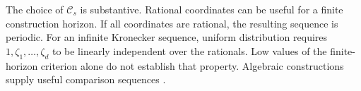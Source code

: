 The choice of $\mathcal C_s$ is substantive. Rational coordinates can be useful for a finite construction horizon.
If all coordinates are rational, the resulting sequence is periodic. For an infinite Kronecker sequence, uniform distribution requires
$1,\zeta_1,\ldots,\zeta_d$ to be linearly independent over the rationals.
Low values of the finite-horizon criterion alone do not establish that
property. Algebraic constructions supply useful comparison sequences
\cite{Richtmyer51,DGLPS25}.

\par\smallskip
\noindent{}
\par\smallskip

